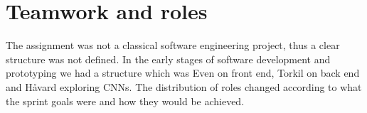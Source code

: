 \section{Teamwork and roles} %
The assignment was not a classical software engineering project, thus a clear structure was not defined. In the early stages of software development and prototyping we had a structure which was Even on front end, Torkil on back end and Håvard exploring CNNs. The distribution of roles changed according to what the sprint goals were and how they would be achieved. %

